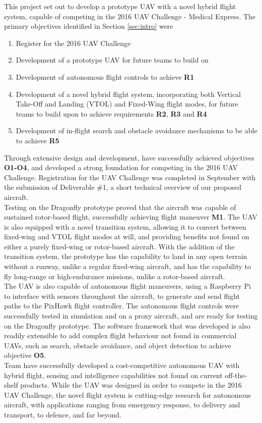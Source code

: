 This project set out to develop a prototype UAV with a novel hybrid flight system, capable of competing in the 2016 UAV Challenge - Medical Express. The primary objectives identified in Section \ref{sec:intro} were
\begin{enumerate}[label=\bfseries O\arabic*:] \itemsep-2pt
	\item Register for the 2016 UAV Challenge
	\item Development of a prototype UAV for future teams to build on
	\item Development of autonomous flight controls to achieve \textbf{R1}
	\item Development of a novel hybrid flight system, incorporating both Vertical Take-Off and Landing (VTOL) and Fixed-Wing flight modes, for future teams to build upon to achieve requirements \textbf{R2}, \textbf{R3} and \textbf{R4}
	\item Development of in-flight search and obstacle avoidance mechanisms to be able to achieve \textbf{R5}
\end{enumerate}

Through extensive design and development, \ID have successfully achieved objectives \textbf{O1-O4}, and developed a strong foundation for competing in the 2016 UAV Challenge. Registration for the UAV Challenge was completed in September with the submission of Deliverable \#1, a short technical overview of our proposed aircraft.\\

Testing on the Dragonfly prototype proved that the aircraft was capable of sustained rotor-based flight, successfully achieving flight maneuver \textbf{M1}. The UAV is also equipped with a novel transition system, allowing it to convert between fixed-wing and VTOL flight modes at will, and providing benefits not found on either a purely fixed-wing or rotor-based aircraft. With the addition of the transition system, the prototype has the capability to land in any open terrain without a runway, unlike a regular fixed-wing aircraft, and has the capability to fly long-range or high-endurance missions, unlike a rotor-based aircraft.\\

The UAV is also capable of autonomous flight maneuvers, using a Raspberry Pi to interface with sensors throughout the aircraft, to generate and send flight paths to the PixHawk flight controller. The autonomous flight controls were successfully tested in simulation and on a proxy aircraft, and are ready for testing on the Dragonfly prototype. The software framework that was developed is also readily extensible to add complex flight behaviour not found in commercial UAVs, such as search, obstacle avoidance, and object detection to achieve objective \textbf{O5}.\\

Team \ID have successfully developed a cost-competitive autonomous UAV with hybrid flight, sensing and intelligence capabilities not found on current off-the-shelf products. While the UAV was designed in order to compete in the 2016 UAV Challenge, the novel flight system is cutting-edge research for autonomous aircraft, with applications ranging from emergency response, to delivery and transport, to defence, and far beyond.